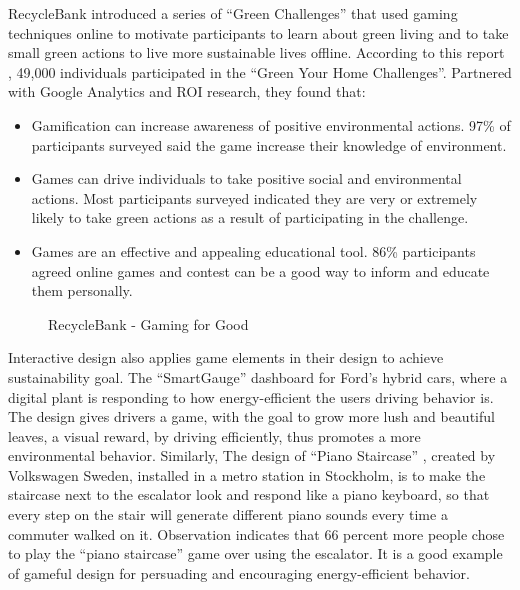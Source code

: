 RecycleBank \cite {recyclebank} introduced a series of ``Green Challenges'' that used gaming techniques online to motivate participants to learn about green living and to take small green actions to live more sustainable lives offline. According to this report \cite {gamingforgood}, 49,000 individuals participated in the ``Green Your Home Challenges''. Partnered with Google Analytics and ROI research, they found that:
\begin{itemize}
	\item Gamification can increase awareness of positive environmental actions. 97\% of participants surveyed said the game increase their knowledge of environment.
	\item Games can drive individuals to take positive social and environmental actions. Most participants surveyed indicated they are very or extremely likely to take green actions as a result of participating in the challenge.
	\item Games are an effective and appealing educational tool. 86\% participants agreed online games and contest can be a good way to inform and educate them personally.
\end{itemize}

\begin{figure}[htbp]
	\centering
		\caption{RecycleBank - Gaming for Good}
		\label{fig:recyclebank}
\end{figure}

Interactive design also applies game elements in their design to achieve sustainability goal. The ``SmartGauge'' dashboard \cite {ideo2009} for Ford's hybrid cars, where a digital plant is responding to how energy-efficient the users driving behavior is. The design gives drivers a game, with the goal to grow more lush and beautiful leaves, a visual reward, by driving efficiently, thus promotes a more environmental behavior. Similarly, The design of ``Piano Staircase'' \cite {funtheory2009}, created by Volkswagen Sweden, installed in a metro station in Stockholm, is to make the staircase next to the escalator look and respond like a piano keyboard, so that every step on the stair will generate different piano sounds every time a commuter walked on it. Observation indicates that 66 percent more people chose to play the ``piano staircase'' game over using the escalator. It is a good example of gameful design for persuading and encouraging energy-efficient behavior.

